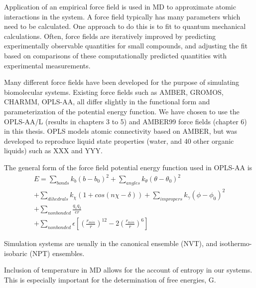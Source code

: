 Application of an empirical force field is used in MD to approximate atomic interactions in the system. A force field typically has many parameters which need to be calculated. One approach to do this is to fit to quantum mechanical calculations.  Often, force fields are iteratively improved by predicting experimentally observable quantities for small compounds, and adjusting the fit based on comparisons of these computationally predicted quantities with experimental measurements.
  
Many different force fields have been developed for the purpose of simulating biomolecular systems. Existing force fields such as AMBER, GROMOS, CHARMM, OPLS-AA, all differ slightly in the functional form and parameterization of the potential energy function. We have chosen to use the OPLS-AA/L (results in chapters 3 to 5) and AMBER99 force fields (chapter 6) in this thesis. OPLS models atomic connectivity based on AMBER, but was developed to reproduce liquid state properties (water, and 40 other organic liquids) such as XXX and YYY.\cite{jay ponder, the opls 1986 paper, and the 1996 all atom paper} 

The general form of the force field potential energy function used in OPLS-AA is
  \begin{equation}
    \begin{split}
          E = \sum_{bonds} k_b(b-b_0)^2 
          + \sum_{angles} k_{\theta}(\theta - \theta_{0})^2 \\
          + \sum_{dihedrals} k_{\chi}(1 + cos(n\chi - \delta)) 
          + \sum_{impropers} k_{\gamma}(\phi - \phi_{0})^2 \\
          + \sum_{nonbonded} \frac{q_1q_2}{er} \\
          + \sum_{nonbonded} \epsilon [(\frac{r_{min}}{r})^{12} - 2(\frac{r_{min}}{r})^6]
    \end{split}
  \end{equation}

Simulation systems are usually in the canonical ensemble (NVT), and isothermo-isobaric (NPT) ensembles.

Inclusion of temperature in MD allows for the account of entropy in our systems.  This is especially important for the determination of free energies, G. 



